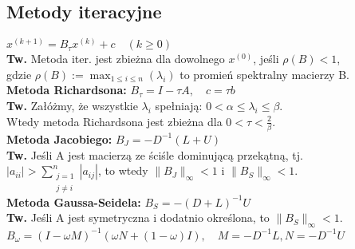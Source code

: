 \documentclass[a4paper,twocolumn]{article}
\begin{document}
\subsection{Metody iteracyjne}
${x}^{(k+1)} = B_{\tau} {x}^{(k)} + {c} \hspace{1em} (k \geq 0)$\\
\textbf{Tw.} Metoda iter. jest zbieżna dla dowolnego $x^{(0)}$, jeśli $\rho(B)<1$,\\
gdzie $\rho(B):=\max_{1 \leq i \leq n} (\lambda_i)$ to promień spektralny macierzy B.\\
\textbf{Metoda Richardsona:} $B_{\tau} = I - \tau A, \hspace{1em} c = \tau b \hspace{1em}$\\
\textbf{Tw.} Załóżmy, że wszystkie $\lambda_i$ spełniają: $0 < \alpha \leq \lambda_i \leq \beta$.\\
Wtedy metoda Richardsona jest zbieżna dla $0 < \tau < \frac{2}{\beta}$.\\
\textbf{Metoda Jacobiego:} $B_J = -D^{-1}(L+U) \hspace{1em}$\\
\textbf{Tw.} Jeśli A jest macierzą ze ściśle dominującą przekątną, tj.\\
$|a_{ii}|>\sum\limits_{\begin{smallmatrix}j=1\\j\neq i\end{smallmatrix}}^{n}|a_{ij}|$, to wtedy $\|B_J\|_\infty < 1$ i $\|B_S\|_\infty < 1$.\\
\textbf{Metoda Gaussa-Seidela:} $B_S = -(D+L)^{-1}U \hspace{1em}$\\
\textbf{Tw.} Jeśli A jest symetryczna i dodatnio określona, to $\|B_S\|_\infty < 1$.\\
$B_{\omega} = (I - \omega M)^{-1} (\omega N + (1 - \omega)I), \hspace{1em} M = -D^{-1}L, N = -D^{-1} U$
\end{document}
